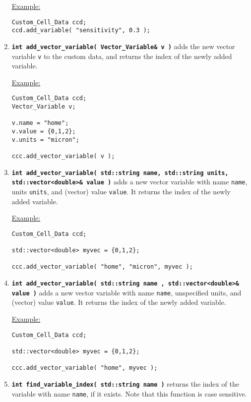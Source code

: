 \documentclass[12pt]{article}
\renewcommand{\v}{\verb}
\newcommand{\smallcode}[1]{\textbf{\texttt{#1}}}
\begin{document}
\begin{enumerate}
\underline{Example:} 
\begin{verbatim}
Custom_Cell_Data ccd; 
ccd.add_variable( "sensitivity", 0.3 ); 
\end{verbatim}
   
\item 
\smallcode{int add\_vector\_variable( Vector\_Variable\& v )} adds the new vector variable \v|v| to the 
custom data, and returns the index of the newly added variable. 

\underline{Example:} 
\begin{verbatim}
Custom_Cell_Data ccd; 
Vector_Variable v; 

v.name = "home"; 
v.value = {0,1,2}; 
v.units = "micron"; 

ccc.add_vector_variable( v ); 
\end{verbatim}

\item 
\smallcode{int add\_vector\_variable( std::string name, std::string units, \\
\phantom{int }std::vector<double>\& value )} 
adds a new vector variable with name \v|name|, units \v|units|, and (vector) value \v|value|. It 
returns the index of the newly added variable. 

\underline{Example:} 
\begin{verbatim}
Custom_Cell_Data ccd; 

std::vector<double> myvec = {0,1,2}; 

ccc.add_vector_variable( "home", "micron", myvec ); 
\end{verbatim}

\item 
\smallcode{int add\_vector\_variable( std::string name , std::vector<double>\& value )}
adds a new vector variable with name \v|name|, unspecified units, and (vector) value \v|value|. It 
returns the index of the newly added variable. 
       
\underline{Example:} 
\begin{verbatim}
Custom_Cell_Data ccd; 

std::vector<double> myvec = {0,1,2}; 

ccc.add_vector_variable( "home", myvec ); 
\end{verbatim}

\item 
\smallcode{int find\_variable\_index( std::string name )} returns the index of the 
variable with name \v|name|, if it exists. Note that this function is case sensitive. 


\end{enumerate}
\end{document}
